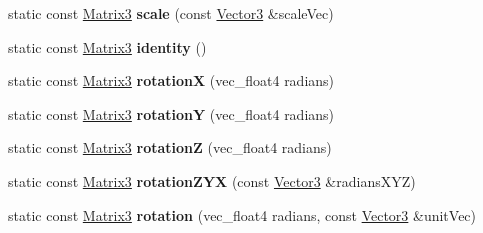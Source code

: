 \begin{DoxyCompactItemize}
\item 
\hypertarget{classVectormath_1_1Soa_1_1Matrix3_ac93617a0820653cd21d53ac3e81f5626}{static const \hyperlink{classVectormath_1_1Soa_1_1Matrix3}{Matrix3} {\bfseries scale} (const \hyperlink{classVectormath_1_1Soa_1_1Vector3}{Vector3} \&scale\-Vec)}\label{classVectormath_1_1Soa_1_1Matrix3_ac93617a0820653cd21d53ac3e81f5626}

\item 
\hypertarget{classVectormath_1_1Soa_1_1Matrix3_a0ea652b931a2308ecd14fecb9e46472d}{static const \hyperlink{classVectormath_1_1Soa_1_1Matrix3}{Matrix3} {\bfseries identity} ()}\label{classVectormath_1_1Soa_1_1Matrix3_a0ea652b931a2308ecd14fecb9e46472d}

\item 
\hypertarget{classVectormath_1_1Soa_1_1Matrix3_aed3d3c62fc3f2849b817ecaa0268ccc7}{static const \hyperlink{classVectormath_1_1Soa_1_1Matrix3}{Matrix3} {\bfseries rotation\-X} (vec\-\_\-float4 radians)}\label{classVectormath_1_1Soa_1_1Matrix3_aed3d3c62fc3f2849b817ecaa0268ccc7}

\item 
\hypertarget{classVectormath_1_1Soa_1_1Matrix3_ac1433f702c444bf29ae2ba7133ba14fc}{static const \hyperlink{classVectormath_1_1Soa_1_1Matrix3}{Matrix3} {\bfseries rotation\-Y} (vec\-\_\-float4 radians)}\label{classVectormath_1_1Soa_1_1Matrix3_ac1433f702c444bf29ae2ba7133ba14fc}

\item 
\hypertarget{classVectormath_1_1Soa_1_1Matrix3_a49f9a406c90f5aa69bcaab23a27c5d43}{static const \hyperlink{classVectormath_1_1Soa_1_1Matrix3}{Matrix3} {\bfseries rotation\-Z} (vec\-\_\-float4 radians)}\label{classVectormath_1_1Soa_1_1Matrix3_a49f9a406c90f5aa69bcaab23a27c5d43}

\item 
\hypertarget{classVectormath_1_1Soa_1_1Matrix3_a15a86163efec39bfe5d7200f1622c531}{static const \hyperlink{classVectormath_1_1Soa_1_1Matrix3}{Matrix3} {\bfseries rotation\-Z\-Y\-X} (const \hyperlink{classVectormath_1_1Soa_1_1Vector3}{Vector3} \&radians\-X\-Y\-Z)}\label{classVectormath_1_1Soa_1_1Matrix3_a15a86163efec39bfe5d7200f1622c531}

\item 
\hypertarget{classVectormath_1_1Soa_1_1Matrix3_a0e4c56225e514e29148d6b9026c368fb}{static const \hyperlink{classVectormath_1_1Soa_1_1Matrix3}{Matrix3} {\bfseries rotation} (vec\-\_\-float4 radians, const \hyperlink{classVectormath_1_1Soa_1_1Vector3}{Vector3} \&unit\-Vec)}\label{classVectormath_1_1Soa_1_1Matrix3_a0e4c56225e514e29148d6b9026c368fb}


\end{DoxyCompactItemize}
